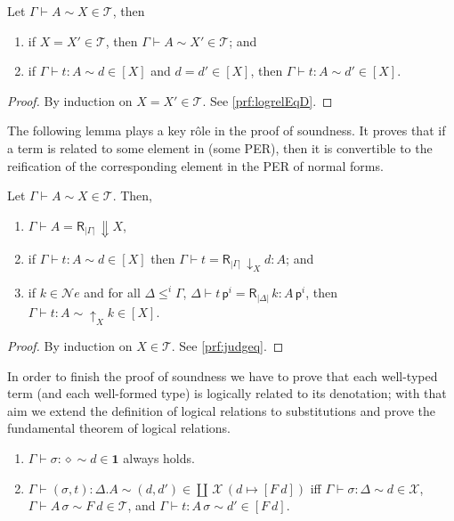 \documentclass{LMCS}
\theoremstyle{plain}\newtheorem{satz}[thm]{Satz}
\newcommand{\LONGVERSION}[1]{#1}
\newcommand{\ectx}{\diamond}
\newcommand{\ctxe}[2]{#1.#2}
\newcommand{\exsubs}[2]{( #1, #2)}
\newcommand{\subsTm}[2]{#1\,#2}
\newcommand{\subsTy}[2]{#1\,#2}
\newcommand{\p}{\mathsf{p}}
\newcommand{\dtype}[2]{#1\vdash#2}
\newcommand{\dterm}[3]{#1\vdash#3:#2}
\newcommand{\dsubs}[3]{#1\vdash#3:#2}
\newcommand{\deqtype}[3]{#1\vdash#2=#3}
\newcommand{\deqterm}[4]{#1\vdash#3=#4:#2}
\newcommand{\lift}[2]{\subsTm{#2}{\p^{#1}}}
\newcommand{\Da}[1]{\mathop{\Downarrow} #1}
\newcommand{\upa}[2]{\mathop{\uparrow}\nolimits_{#1}{#2}}
\newcommand{\da}[2]{\mathop{\downarrow}\nolimits_{#1}{#2}}
\newcommand{\reifyC}[2]{\mathsf{R}_{|#1|}\,#2}
\newcommand{\calX}{\mathcal{X}}
\newcommand{\sigD}[2]{\coprod\,#1\,#2}
\newcommand{\perne}{\mathord{\mathcal{N}\!\mathit{e}}}
\newcommand{\perT}{\mathcal{T}}
\newcommand{\rel}{\sim}
\newcommand{\one}{\mathbf{1}}
\newcommand{\iPair}[2]{(#1 , #2)}
\newcommand{\LONGVERSION}[1]{}
\begin{document}
\begin{lem}
  \label{lem:logrelEqD}
  Let $\dtype{\Gamma}{A}\rel X\in \perT$, then
  \begin{enumerate}[\em(a)]
  \item if $X = X' \in\perT$, then $\dtype{\Gamma}{A}\rel X'\in\perT$;
    and
  \item if $\dterm{\Gamma}{A}{t}\rel d\in [X]$ and 
    $d=d' \in [X]$, then $\dterm{\Gamma}{A}{t}\rel d' \in [X]$.
  \end{enumerate}
\end{lem}
\LONGVERSION{
\begin{proof}By induction on $X = X' \in \perT$. See \ref{prf:logrelEqD}.
\end{proof}
}

The following lemma plays a key r\^ole in the proof of soundness. It
proves that if a term is related to some element in (some PER), then
it is convertible to the reification of the corresponding element in
the PER of normal forms.


\begin{lem}\label{lem:judgeq}
  Let $\dtype{\Gamma}{A}\rel X\in\perT$.  Then, 
  \begin{enumerate}[\em(a)]
  \item $\deqtype{\Gamma}{A}{\reifyC{\Gamma}{\Da{X}}} $,
  \item if $\dterm{\Gamma}{A}{t}\rel d \in [X]$ then 
     $\deqterm{\Gamma}{A}{t}{\reifyC{\Gamma}{\da{X}{d}}}$; and
  \item if $k \in \perne$ and for all $\Delta \leqslant^i \Gamma$,
    $\deqterm{\Delta}{\lift{i}{A}}{\lift{i}{t}}{\reifyC{\Delta}{k}}$,
    then $\dterm{\Gamma}{A}{t} \rel \upa{X}{k} \in [X]$.
  \end{enumerate}
\end{lem}
\LONGVERSION{
\begin{proof}By induction on $X\in \perT$. See \ref{prf:judgeq}.
\end{proof}
}

In order to finish the proof of soundness we have to prove that each
well-typed term (and each well-formed type) is logically related to
its denotation; with that aim we extend the definition of logical
relations to substitutions and prove the fundamental theorem of
logical relations.

\begin{defi} \hfill
  \label{logrelsubs}
  \begin{enumerate}[(1)]
  \item $\dsubs{\Gamma}{\ectx}{\sigma}\rel d \in\one$ always holds.
  \item $\dsubs{\Gamma}{\ctxe{\Delta}{A}}{\exsubs{\sigma}{t}} \rel
    \iPair{d}{d'} \in \sigD{\calX}{(d \mapsto [F\ d])}$ iff
    $\dsubs{\Gamma}{\Delta}{\sigma} \rel d \in \calX$,
    $\dtype{\Gamma}{\subsTy{A}{\sigma}}\rel F\ d\in \perT$, and
    $\dterm{\Gamma}{\subsTy{A}{\sigma}}{t} \rel d'\in [F\ d]$.
  \end{enumerate}
\end{defi}\medskip
\end{document}
